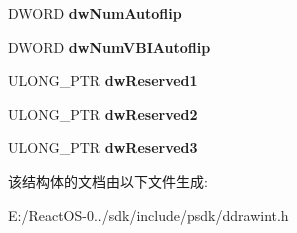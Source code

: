 \begin{DoxyCompactItemize}
D\+W\+O\+RD {\bfseries dw\+Num\+Autoflip}
\item 
\mbox{\label{struct___d_d___v_i_d_e_o_p_o_r_t___l_o_c_a_l_a04f7431a277a70474a3df29efba5c2b6}} 
D\+W\+O\+RD {\bfseries dw\+Num\+V\+B\+I\+Autoflip}
\item 
\mbox{\label{struct___d_d___v_i_d_e_o_p_o_r_t___l_o_c_a_l_a50db6e4acee9221b1884a8991967692d}} 
U\+L\+O\+N\+G\+\_\+\+P\+TR {\bfseries dw\+Reserved1}
\item 
\mbox{\label{struct___d_d___v_i_d_e_o_p_o_r_t___l_o_c_a_l_a4443b5553a3b3563b272a14d9aaec041}} 
U\+L\+O\+N\+G\+\_\+\+P\+TR {\bfseries dw\+Reserved2}
\item 
\mbox{\label{struct___d_d___v_i_d_e_o_p_o_r_t___l_o_c_a_l_aeb24af7377d4ab1613b433e5f079054e}} 
U\+L\+O\+N\+G\+\_\+\+P\+TR {\bfseries dw\+Reserved3}
\end{DoxyCompactItemize}


该结构体的文档由以下文件生成\+:\begin{DoxyCompactItemize}
\item 
E\+:/\+React\+O\+S-\/0../sdk/include/psdk/ddrawint.\+h\end{DoxyCompactItemize}
